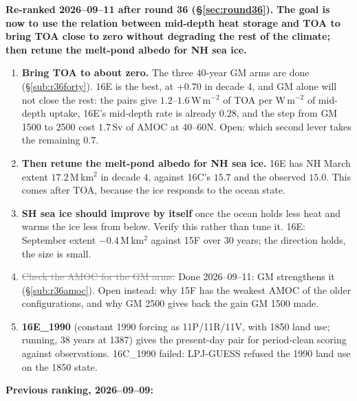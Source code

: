 \documentclass[10pt]{article}
\newcommand{\dead}[1]{\textcolor{gray}{\sout{#1}}}
\begin{document}
\textbf{Re-ranked 2026--09--11 after round 36 (\S\ref{sec:round36}).} \textbf{The goal is now
to use the relation between mid-depth heat storage and TOA to bring TOA close to zero without
degrading the rest of the climate; then retune the melt-pond albedo for NH sea ice.}
\begin{enumerate}\itemsep2pt
\item \textbf{Bring TOA to about zero.} The three 40-year GM arms are done
(\S\ref{sub:r36forty}). 16E is the best, at $+0.70$ in decade 4, and GM alone will not close
the rest: the pairs give $1.2$--$1.6$\,W\,m$^{-2}$ of TOA per W\,m$^{-2}$ of mid-depth uptake,
16E's mid-depth rate is already $0.28$, and the step from GM 1500 to 2500 cost $1.7$\,Sv of
AMOC at 40--60N. Open: which second lever takes the remaining $0.7$.
\item \textbf{Then retune the melt-pond albedo for NH sea ice.} 16E has NH March extent
$17.2$\,M\,km$^2$ in decade 4, against 16C's $15.7$ and the observed $15.0$. This comes after
TOA, because the ice responds to the ocean state.
\item \textbf{SH sea ice should improve by itself} once the ocean holds less heat and warms the
ice less from below. Verify this rather than tune it. 16E: September extent $-0.4$\,M\,km$^2$
against 15F over 30 years; the direction holds, the size is small.
\item \dead{Check the AMOC for the GM arms.} Done 2026--09--11: GM strengthens it
(\S\ref{sub:r36amoc}). Open instead: why 15F has the weakest AMOC of the older
configurations, and why GM 2500 gives back the gain GM 1500 made.
\item \textbf{16E\_1990} (constant 1990 forcing as 11P/11R/11V, with 1850 land use; running,
38 years at 1387) gives the present-day pair for period-clean scoring against observations.
16C\_1990 failed: LPJ-GUESS refused the 1990 land use on the 1850 state.
\end{enumerate}

\textbf{Previous ranking, 2026--09--09:}
\end{document}
